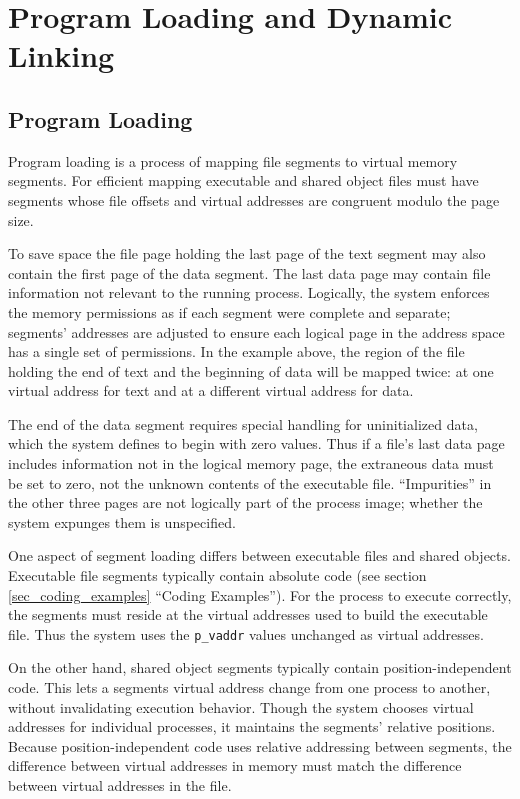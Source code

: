 \chapter{Program Loading and Dynamic Linking}

\section{Program Loading}

Program loading is a process of mapping file segments to virtual
memory segments. For efficient mapping executable and shared object
files must have segments whose file offsets and virtual addresses are
congruent modulo the page size.

To save space the file page holding the last page of the text segment
may also contain the first page of the data segment. The last data
page may contain file information not relevant to the running process.
Logically, the system enforces the memory permissions as if each
segment were complete and separate; segments' addresses are adjusted
to ensure each logical page in the address space has a single set of
permissions. In the example above, the region of the file holding the
end of text and the beginning of data will be mapped twice: at one
virtual address for text and at a different virtual address for data.
 
The end of the data segment requires special handling for
uninitialized data, which the system defines to begin with zero
values. Thus if a file's last data page includes information not in
the logical memory page, the extraneous data must be set to zero, not
the unknown contents of the executable file. ``Impurities'' in the
other three pages are not logically part of the process image; whether
the system expunges them is unspecified.

One aspect of segment loading differs between executable files and
shared objects. Executable file segments typically contain absolute
code (see section \ref{sec_coding_examples} ``Coding Examples'').
For the process to
execute correctly, the segments must reside at the virtual addresses
used to build the executable file. Thus the system uses the {\tt p_vaddr}
values unchanged as virtual addresses.

On the other hand, shared object segments typically contain
position-independent code. This lets a segments virtual address
change from one process to another, without invalidating execution
behavior. Though the system chooses virtual addresses for individual
processes, it maintains the segments' relative positions. Because
position-independent code uses relative addressing between segments,
the difference between virtual addresses in memory must match the
difference between virtual addresses in the file.

